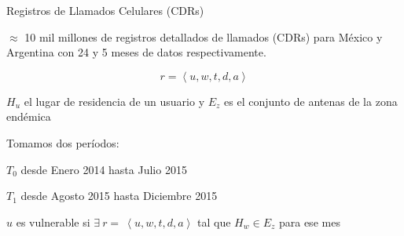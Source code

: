 \documentclass[xcolor=x11names]{beamer}
\begin{document}
\begin{frame}{Registros de Llamados Celulares (CDRs)}

	$\approx$ 10 mil millones de registros detallados de llamados (CDRs) para México y Argentina con 24 y 5 meses de datos respectivamente.

	$$r =\left < u, w, t, d, a \right >$$

	\medskip



	$H_u$ el lugar de residencia de un usuario y $E_z$ es el conjunto de antenas de la zona endémica
	\smallskip

	Tomamos dos períodos:
	\smallskip
	\begin{enumerate*}[label={\alph*)},]
			\item $T_0$ desde Enero 2014 hasta Julio 2015
			\item $T_1$ desde Agosto 2015 hasta Diciembre 2015
	\end{enumerate*}

	\medskip
	 $u$ es vulnerable si $\exists \ r = \ \left < u, w, t, d, a \right > $ tal que $H_w \in E_z$ para ese mes


\end{frame}
\end{document}
